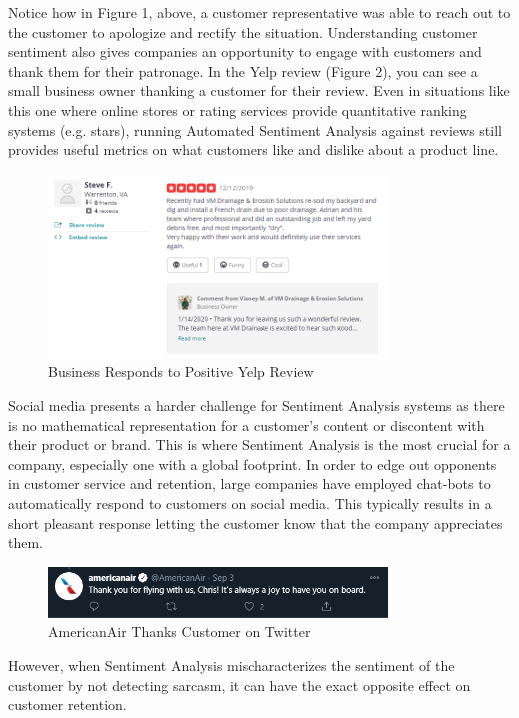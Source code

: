 \documentclass[conference]{IEEEtran}
\begin{document}
Notice how in Figure 1, above, a customer representative was able to reach out to the customer to apologize and rectify the situation. Understanding customer sentiment also gives companies an opportunity to engage with customers and thank them for their patronage. In the Yelp review (Figure 2), you can see a small business owner thanking a customer for their review.  Even in situations like this one where online stores or rating services provide quantitative ranking systems (e.g. stars), running Automated Sentiment Analysis against reviews still provides useful metrics on what customers like and dislike about a product line.\\

\begin{figure}[htbp]
\centerline{\includegraphics[width=9cm]{image 2.png}}
\caption{Business Responds to Positive Yelp Review}
\label{fig2}
\end{figure}

Social media presents a harder challenge for Sentiment Analysis systems as there is no mathematical representation for a customer’s content or discontent with their product or brand. This is where Sentiment Analysis is the most crucial for a company, especially one with a global footprint. In order to edge out opponents in customer service and retention, large companies have employed chat-bots to automatically respond to customers on social media. This typically results in a short pleasant response letting the customer know that the company appreciates them.\\

\begin{figure}[htbp]
\centerline{\includegraphics[width=9cm]{image4.png}}
\caption{AmericanAir Thanks Customer on Twitter}
\label{fig3}
\end{figure}


However, when Sentiment Analysis mischaracterizes the sentiment of the customer by not detecting sarcasm, it can have the exact opposite effect on customer retention. \\
\end{document}
